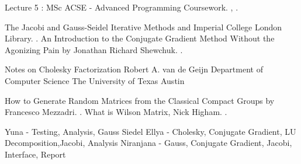 \documentclass[twoside,twocolumn]{article}
\begin{document}
\begin{thebibliography}{99} 
\bibitem[1]{}Lecture 5 : MSc ACSE - Advanced Programming Coursework.
, .
 
 \bibitem[2]{} The Jacobi and Gauss-Seidel Iterative Methods and Imperial College London Library.
.
\bibitem[3]{}An Introduction to the Conjugate Gradient Method Without the Agonizing Pain by Jonathan Richard Shewchuk.
.

\bibitem[5]{}Notes on Cholesky Factorization Robert A. van de Geijn Department of Computer Science The University of Texas Austin

\bibitem[6]{}How to Generate Random Matrices from the Classical Compact Groups by Francesco Mezzadri.
.
\bibitem[7]{}What is Wilson Matrix, Nick Higham.
.

\end{thebibliography}
Yuna - Testing, Analysis, Gauss Siedel \quad \quad \quad \quad \quad \quad \quad \quad
Ellya - Cholesky, Conjugate Gradient, LU Decomposition,Jacobi, Analysis \quad \quad \quad
Niranjana - Gauss, Conjugate Gradient, Jacobi, Interface, Report
\end{document}
